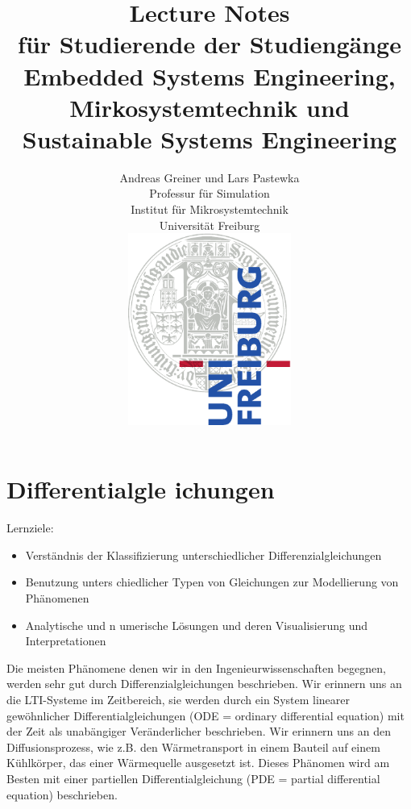 \documentclass[a4paper,12pt]{book}%
\title{\huge Lecture Notes\\
\large für Studierende der Studiengänge Embedded Systems Engineering, Mirkosystemtechnik und Sustainable Systems Engineering}
\author{Andreas Greiner und Lars Pastewka \\Professur für Simulation\\Institut für Mikrosystemtechnik\\Universität Freiburg\\[1cm]
  \includegraphics[width=0.4\textwidth]{fig/Uni_Logo-Grundversion_E1_A4_RGB}
}
\begin{document}
\frontmatter
\maketitle
\part{Differentialgle ichungen}
Lernziele:
\begin{itemize}
\item Verständnis der Klassifizierung unterschiedlicher Differenzialgleichungen
\item Benutzung unters chiedlicher Typen von Gleichungen zur Modellierung von Phä\-nomenen
\item Analytische und n umerische Lösungen und deren Visualisierung und Interpretationen
\end{itemize}
Die meisten Phänomene denen wir in den Ingenieurwissenschaften begegnen,
werden sehr gut durch Differenzialgleichungen beschrieben. Wir erinnern uns an
die LTI-Systeme im Zeitbereich,  sie werden durch ein System linearer gewöhnlicher
Differentialgleichungen (ODE = ordinary differential equation) mit der Zeit als
unabängiger Veränderlicher beschrieben. Wir erinnern uns an den
Diffusionsprozess, wie z.B. den Wärmetransport in einem Bauteil auf einem
Kühlkörper, das einer Wärmequelle ausgesetzt ist. Dieses Phänomen wird am
Besten mit einer partiellen Differentialgleichung (PDE = partial differential
equation) beschrieben.
\end{document}

